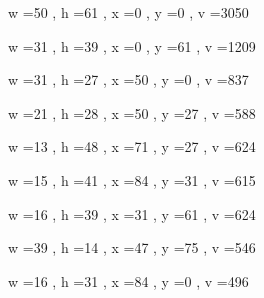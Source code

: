 \documentclass[11pt]{article}
\begin{document}
w =50 , h =61 , x =0 , y =0 , v =3050
\par
w =31 , h =39 , x =0 , y =61 , v =1209
\par
w =31 , h =27 , x =50 , y =0 , v =837
\par
w =21 , h =28 , x =50 , y =27 , v =588
\par
w =13 , h =48 , x =71 , y =27 , v =624
\par
w =15 , h =41 , x =84 , y =31 , v =615
\par
w =16 , h =39 , x =31 , y =61 , v =624
\par
w =39 , h =14 , x =47 , y =75 , v =546
\par
w =16 , h =31 , x =84 , y =0 , v =496
\par
\newpage
\end{document}
